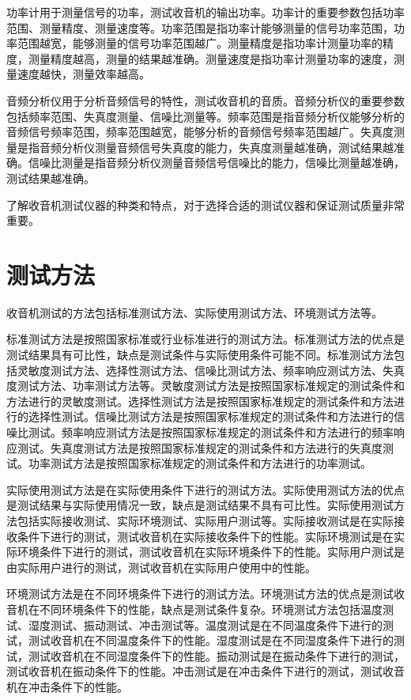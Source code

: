\documentclass[12pt,UTF8]{ctexbook}
\begin{document}
功率计用于测量信号的功率，测试收音机的输出功率。功率计的重要参数包括功率范围、测量精度、测量速度等。功率范围是指功率计能够测量的信号功率范围，功率范围越宽，能够测量的信号功率范围越广。测量精度是指功率计测量功率的精度，测量精度越高，测量的结果越准确。测量速度是指功率计测量功率的速度，测量速度越快，测量效率越高。

音频分析仪用于分析音频信号的特性，测试收音机的音质。音频分析仪的重要参数包括频率范围、失真度测量、信噪比测量等。频率范围是指音频分析仪能够分析的音频信号频率范围，频率范围越宽，能够分析的音频信号频率范围越广。失真度测量是指音频分析仪测量音频信号失真度的能力，失真度测量越准确，测试结果越准确。信噪比测量是指音频分析仪测量音频信号信噪比的能力，信噪比测量越准确，测试结果越准确。

了解收音机测试仪器的种类和特点，对于选择合适的测试仪器和保证测试质量非常重要。

\section{测试方法}

收音机测试的方法包括标准测试方法、实际使用测试方法、环境测试方法等。

标准测试方法是按照国家标准或行业标准进行的测试方法。标准测试方法的优点是测试结果具有可比性，缺点是测试条件与实际使用条件可能不同。标准测试方法包括灵敏度测试方法、选择性测试方法、信噪比测试方法、频率响应测试方法、失真度测试方法、功率测试方法等。灵敏度测试方法是按照国家标准规定的测试条件和方法进行的灵敏度测试。选择性测试方法是按照国家标准规定的测试条件和方法进行的选择性测试。信噪比测试方法是按照国家标准规定的测试条件和方法进行的信噪比测试。频率响应测试方法是按照国家标准规定的测试条件和方法进行的频率响应测试。失真度测试方法是按照国家标准规定的测试条件和方法进行的失真度测试。功率测试方法是按照国家标准规定的测试条件和方法进行的功率测试。

实际使用测试方法是在实际使用条件下进行的测试方法。实际使用测试方法的优点是测试结果与实际使用情况一致，缺点是测试结果不具有可比性。实际使用测试方法包括实际接收测试、实际环境测试、实际用户测试等。实际接收测试是在实际接收条件下进行的测试，测试收音机在实际接收条件下的性能。实际环境测试是在实际环境条件下进行的测试，测试收音机在实际环境条件下的性能。实际用户测试是由实际用户进行的测试，测试收音机在实际用户使用中的性能。

环境测试方法是在不同环境条件下进行的测试方法。环境测试方法的优点是测试收音机在不同环境条件下的性能，缺点是测试条件复杂。环境测试方法包括温度测试、湿度测试、振动测试、冲击测试等。温度测试是在不同温度条件下进行的测试，测试收音机在不同温度条件下的性能。湿度测试是在不同湿度条件下进行的测试，测试收音机在不同湿度条件下的性能。振动测试是在振动条件下进行的测试，测试收音机在振动条件下的性能。冲击测试是在冲击条件下进行的测试，测试收音机在冲击条件下的性能。
\end{document}
